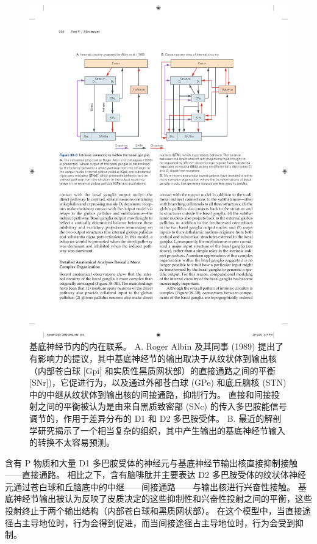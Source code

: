 \begin{figure}[htbp]
	\centering
	\includegraphics[width=0.85\linewidth]{chap38/fig_38_3}
	\caption{基底神经节内的内在联系。 A. Roger Albin 及其同事 (1989) 提出了有影响力的提议，其中基底神经节的输出取决于从纹状体到输出核（内部苍白球 [Gpi] 和实质性黑质网状部）的直接通路之间的平衡 [SNr])，它促进行为，以及通过外部苍白球 (GPe) 和底丘脑核 (STN) 中的中继从纹状体到输出核的间接通路，抑制行为。 直接和间接投射之间的平衡被认为是由来自黑质致密部 (SNc) 的传入多巴胺能信号调节的，作用于差异分布的 D1 和 D2 多巴胺受体。 B. 最近的解剖学研究揭示了一个相当复杂的组织，其中产生输出的基底神经节输入的转换不太容易预测。}
	\label{fig:38_3}
\end{figure}

含有 P 物质和大量 D1 多巴胺受体的神经元与基底神经节输出核直接抑制接触——直接通路。 相比之下，含有脑啡肽并主要表达 D2 多巴胺受体的纹状体神经元通过苍白球和丘脑底中的中继——间接通路——与输出核进行兴奋性接触。 基底神经节输出被认为反映了皮质决定的这些抑制性和兴奋性投射之间的平衡，这些投射终止于两个输出结构（内部苍白球和黑质网状部）。 在这个模型中，当直接途径占主导地位时，行为会得到促进，而当间接途径占主导地位时，行为会受到抑制。

